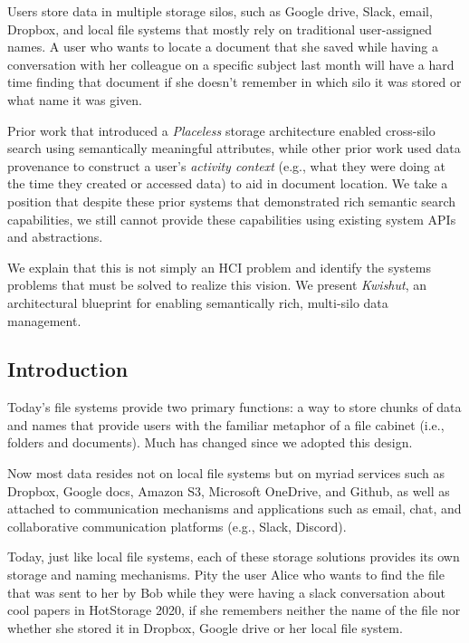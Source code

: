 Users store data in multiple storage silos, such as Google drive, Slack, email,
Dropbox, and local file systems that mostly rely on traditional user-assigned
names. A user who wants to locate a document that she saved while having a
conversation with her colleague on a specific subject last month will have a
hard time finding that document if she doesn’t remember in which silo it was
stored or what name it was given.

Prior work that introduced a \emph{Placeless} storage architecture enabled
cross-silo search using semantically meaningful attributes, while other prior
work used data provenance to construct a user's \emph{activity context} (e.g.,
what they were doing at the time they created or accessed data) to aid in
document location. We take a position that despite these prior systems that
demonstrated rich semantic search capabilities, we still cannot provide these
capabilities using existing system APIs and abstractions.

We explain that this is not simply an HCI problem and identify the systems
problems that must be solved to realize this vision. We present \emph{Kwishut}, an
architectural blueprint for enabling semantically rich, multi-silo data
management.

\subsection{Introduction}

Today's file systems provide two primary functions: a way to store chunks of data and names that provide users with the familiar
metaphor of a file cabinet (i.e., folders and documents).
Much has changed since we adopted this design.

Now most data resides not on local file systems but on myriad services such as
Dropbox, Google docs, Amazon S3, Microsoft OneDrive, and Github, as well as
attached to communication mechanisms and applications such as email, chat, and
collaborative communication platforms (e.g., Slack, Discord).

Today, just like local file systems, each of these storage solutions provides
its own storage and naming mechanisms. Pity the user Alice who wants to find the
file that was sent to her by Bob while they were having a slack conversation
about cool papers in HotStorage 2020, if she remembers neither the name of the
file nor whether she stored it in Dropbox, Google drive or her local file
system.

